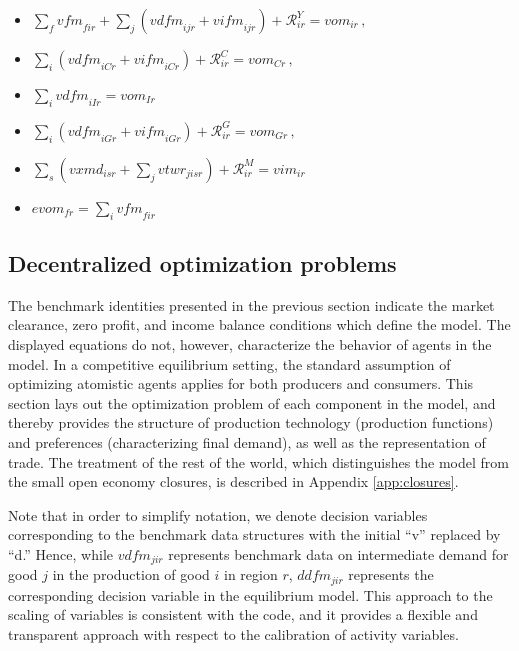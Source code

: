 \begin{itemize}
\item[$Y_{ir}$:] $\sum_f \textit{vfm}_{fir} + \sum_j \left(\textit{vdfm}_{ijr} + \textit{vifm}_{ijr} \right) + \mathcal{R}^Y_{ir} = \textit{vom}_{ir}\,,$
\item[$C_{r}$:] $\sum_i \left(\textit{vdfm}_{iCr} + \textit{vifm}_{iCr} \right) + \mathcal{R}^C_{ir} = \textit{vom}_{Cr}\,,$
\item[$I_{r}$:] $\sum_i \textit{vdfm}_{iIr} = \textit{vom}_{Ir}$
\item[$G_{r}$:] $\sum_i \left(\textit{vdfm}_{iGr} + \textit{vifm}_{iGr} \right) + \mathcal{R}^G_{ir} = \textit{vom}_{Gr}\,,$
\item[$M_{ir}$:] $\sum_s \left(\textit{vxmd}_{isr} + \sum_j \textit{vtwr}_{jisr} \right) + \mathcal{R}^M_{ir} = \textit{vim}_{ir}$
\item[$FT_{fr}$:] $\textit{evom}_{fr} = \sum_i \textit{vfm}_{fir}$
\end{itemize}

\subsection[Optimization problems]{Decentralized optimization problems}

The benchmark identities presented in the previous section indicate the market clearance, zero profit, and income balance conditions which define the \GTAP model.
The displayed equations do not, however, characterize the behavior of agents in the model.
In a competitive equilibrium setting, the standard assumption of optimizing atomistic agents applies for both producers and consumers.
This section lays out the optimization problem of each component in the model, and thereby provides the structure of production technology (production functions) and preferences (characterizing final demand), as well as the representation of trade.
The treatment of the rest of the world, which distinguishes the \GMR model from the small open economy closures, is described in Appendix \ref{app:closures}.

Note that in order to simplify notation, we denote decision variables corresponding to the benchmark data structures with the initial ``v'' replaced by ``d.''
Hence, while $vdfm_{jir}$ represents benchmark data on intermediate demand for good $j$ in the production of good $i$ in region $r$, $ddfm_{jir}$ represents the corresponding decision variable in the equilibrium model.
This approach to the scaling of variables is consistent with the \GAMS code, and it provides a flexible and transparent approach with respect to the calibration of activity variables.

